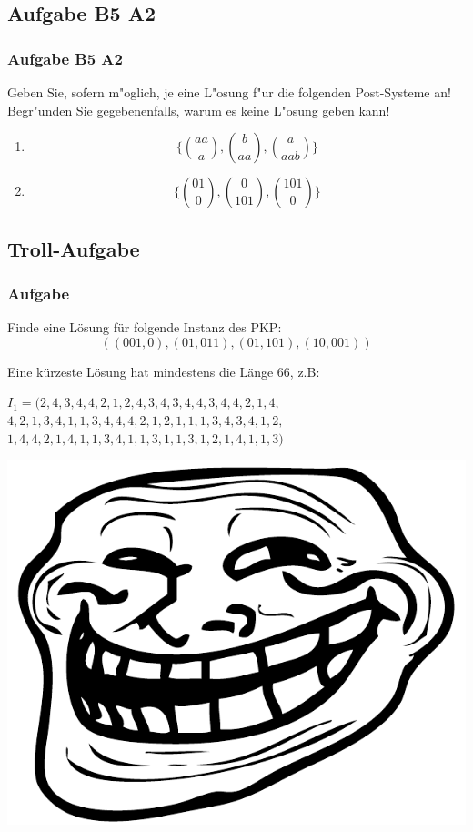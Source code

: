 \subsection{Aufgabe B5 A2}
\begin{frame}
	\frametitle{Aufgabe B5 A2}
	Geben Sie, sofern m"oglich, je eine L"osung f"ur die folgenden Post-Systeme an! \\
	Begr"unden Sie gegebenenfalls, warum es keine L"osung geben kann!
	\vspace{5mm}
	\begin{enumerate}
		\item \begin{displaymath} \{ {aa \choose a}, {b \choose aa}, {a \choose aab} \} \end{displaymath}
		\item \begin{displaymath} \{ {01 \choose 0}, {0 \choose 101}, {101 \choose 0} \} \end{displaymath}
	\end{enumerate}
\end{frame}

\subsection{Troll-Aufgabe}
\begin{frame}
\frametitle{Aufgabe}
Finde eine Lösung für folgende Instanz des PKP:
$$ ((001,0),(01,011),(01,101),(10,001)) $$

\invincible
\pause

Eine kürzeste Lösung hat mindestens die Länge 66, z.B:
\begin{center}
$ I_1 = (2, 4, 3, 4, 4, 2, 1, 2, 4, 3, 4, 3, 4, 4, 3, 4, 4, 2, 1, 4,$ \\
$4, 2, 1, 3, 4, 1, 1, 3, 4, 4, 4, 2, 1, 2, 1, 1, 1, 3, 4, 3, 4, 1, 2,$ \\
$1, 4, 4, 2, 1, 4, 1, 1, 3, 4, 1, 1, 3, 1, 1, 3, 1, 2, 1, 4, 1, 1, 3)$
\end{center}

\pause

\includegraphics{images/trollface}

\vincible

\end{frame}

